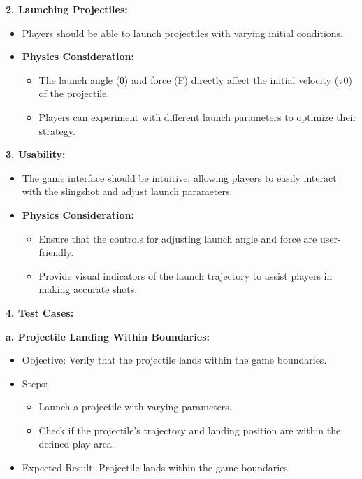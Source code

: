 \documentclass[
]{article}
\begin{document}
\textbf{2. Launching Projectiles:}

\begin{itemize}
\item
  Players should be able to launch projectiles with varying initial
  conditions.
\item
  \textbf{Physics Consideration:}

  \begin{itemize}
  \item
    The launch angle (θ) and force (F) directly affect the initial
    velocity (v0\hspace{0pt}) of the projectile.
  \item
    Players can experiment with different launch parameters to optimize
    their strategy.
  \end{itemize}
\end{itemize}

\textbf{3. Usability:}

\begin{itemize}
\item
  The game interface should be intuitive, allowing players to easily
  interact with the slingshot and adjust launch parameters.
\item
  \textbf{Physics Consideration:}

  \begin{itemize}
  \item
    Ensure that the controls for adjusting launch angle and force are
    user-friendly.
  \item
    Provide visual indicators of the launch trajectory to assist players
    in making accurate shots.
  \end{itemize}
\end{itemize}

\textbf{4. Test Cases:}

\textbf{a. Projectile Landing Within Boundaries:}

\begin{itemize}
\item
  Objective: Verify that the projectile lands within the game
  boundaries.
\item
  Steps:

  \begin{itemize}
  \item
    Launch a projectile with varying parameters.
  \item
    Check if the projectile's trajectory and landing position are within
    the defined play area.
  \end{itemize}
\item
  Expected Result: Projectile lands within the game boundaries.
\end{itemize}
\end{document}
